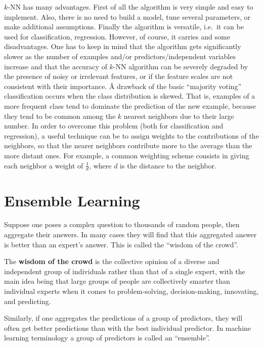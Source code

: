
$k$-NN has many advantages. First of all the algorithm is very simple and easy to implement. Also, there is no need
to build a model, tune several parameters, or make additional assumptions. Finally the algorithm is versatile, i.e.\
it can be used for classification, regression. However, of course, it carries and some disadvantages. One has to
keep in mind that the algorithm gets significantly slower as the number of examples and/or predictors/independent
variables increase and that the accuracy of $k$-NN algorithm can be severely degraded by the presence of noisy or
irrelevant features, or if the feature scales are not consistent with their importance. \v

A drawback of the basic ``majority voting'' classification occurs when the class distribution is skewed. That is,
examples of a more frequent class tend to dominate the prediction of the new example, because they tend to be common
among the $k$ nearest neighbors due to their large number. In order to overcome this problem (both for classification
and regression), a useful technique can be to assign weights to the contributions of the neighbors, so that the
nearer neighbors contribute more to the average than the more distant ones. For example, a common weighting scheme
consists in giving each neighbor a weight of $\frac{1}{d}$, where $d$ is the distance to the neighbor.

\section{Ensemble Learning}

Suppose one poses a complex question to thousands of random people, then aggregate their answers. In many cases they
will find that this aggregated answer is better than an expert's answer. This is called the ``wisdom of the crowd''.

The \textbf{wisdom of the crowd} is the collective opinion of a diverse and independent group of individuals rather
than that of a single expert, with the main idea being that large groups of people are collectively smarter than
individual experts when it comes to problem-solving, decision-making, innovating, and predicting.
\ed

Similarly, if one aggregates the predictions of a group of predictors, they will often get better predictions than
with the best individual predictor. In machine learning terminology a group of predictors is called an ``ensemble''.


